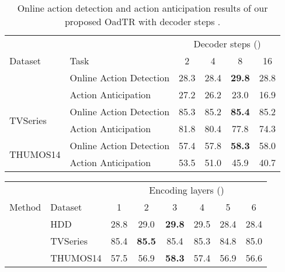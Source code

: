 \documentclass[10pt,twocolumn,letterpaper]{article}
\newcommand{\tablestyle}[2]{\setlength{\tabcolsep}{#1}\renewcommand{\arraystretch}{#2}\centering\footnotesize}
\begin{document}
{\begin{table}[t]
    \centering
    \footnotesize
\tablestyle{4pt}{1.05}
\begin{tabular}
        {@{\;\;}l@{\;\;}@{\;\;}|l@{\;\;}@{\;\;}c@{\;\;}@{\;\;}c@{\;\;}@{\;\;}c@{\;\;}@{\;\;}c@{\;\;}}
& & \multicolumn{4}{c}{Decoder steps ()}\\
\cline{3-6}
        Dataset & Task & 2 & 4 & 8 & 16 \\
\shline
\multirow{2}{*}{HDD}
        & {Online Action Detection}   & 28.3 & 28.4 & \bf{29.8} & 28.8 \\
        & {Action Anticipation}       & 27.2 & 26.2 & 23.0 & 16.9 \\ 
\hline
        \multirow{2}{*}{TVSeries}
        & {Online Action Detection}   & 85.3 & 85.2 & \bf{85.4} & 85.2 \\
        & {Action Anticipation}       & 81.8 & 80.4 & 77.8 & 74.3 \\ 
\hline
        \multirow{2}{*}{THUMOS14}
        & {Online Action Detection}   & 57.4 & 57.8 & \bf{58.3} & 58.0 \\
        & {Action Anticipation}       & 53.5 & 51.0 & 45.9 & 40.7 \\


    \end{tabular}
    \vspace{-5pt}
    \caption{
        Online action detection and action anticipation results of our proposed OadTR
        with decoder steps .
    }
    \vspace{-8pt}
    \label{table:decoder}
\end{table}
\begin{table}[t]
    \centering
    \footnotesize
    \begin{subtable}[t]{\linewidth}
\centering
\tablestyle{4pt}{1.05}
    \begin{tabular}
        {@{\;\;}l@{\;\;}@{\;\;}|l@{\;\;}@{\;\;}c@{\;\;}@{\;\;}c@{\;\;}@{\;\;}c@{\;\;}@{\;\;}c@{\;\;}@{\;\;}c@{\;\;}@{\;\;}c}
& & \multicolumn{6}{c}{Encoding layers ()}\\
\cline{3-8}
        Method & Dataset & 1 & 2 & 3 & 4 & 5 & 6 \\
\shline
        \multirow{3}{*}{OadTR}
        & {HDD}   & 28.8 & 29.0 & \bf{29.8} & 29.5 & 28.4 & 28.4 \\ & {TVSeries}   & 85.4 & \bf{85.5} & 85.4 & 85.3 & 84.8 & 85.0 \\ & {THUMOS14}   & 57.5 & 56.9 & \bf{58.3} & 57.4 & 56.9 & 56.6 \\



\end{tabular}
\end{subtable}
\end{table}}
\end{document}
